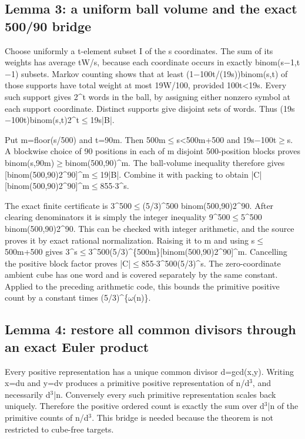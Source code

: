 \documentclass[11pt,a4paper]{article}
\begin{document}
\subsection{Lemma 3: a uniform ball volume and the exact 500/90 bridge}
Choose uniformly a t-element subset I of the s coordinates. The sum of its weights has average tW/s, because each coordinate occurs in exactly binom(s\ensuremath{-}1,t\ensuremath{-}1) subsets. Markov counting shows that at least (1\ensuremath{-}100t/(19s))binom(s,t) of those supports have total weight at most 19W/100, provided 100t<19s. Every such support gives 2\textasciicircum{}t words in the ball, by assigning either nonzero symbol at each support coordinate. Distinct supports give disjoint sets of words. Thus (19s\ensuremath{-}100t)binom(s,t)2\textasciicircum{}t\ensuremath{\leq}19s|B|.

Put m=floor(s/500) and t=90m. Then 500m\ensuremath{\leq}s<500m+500 and 19s\ensuremath{-}100t\ensuremath{\geq}s. A blockwise choice of 90 positions in each of m disjoint 500-position blocks proves binom(s,90m)\ensuremath{\geq}binom(500,90)\textasciicircum{}m. The ball-volume inequality therefore gives [binom(500,90)2\textasciicircum{}90]\textasciicircum{}m\ensuremath{\leq}19|B|. Combine it with packing to obtain |C|[binom(500,90)2\textasciicircum{}90]\textasciicircum{}m\ensuremath{\leq}855\ensuremath{\cdot}3\textasciicircum{}s.

The exact finite certificate is 3\textasciicircum{}500\ensuremath{\leq}(5/3)\textasciicircum{}500 binom(500,90)2\textasciicircum{}90. After clearing denominators it is simply the integer inequality 9\textasciicircum{}500\ensuremath{\leq}5\textasciicircum{}500 binom(500,90)2\textasciicircum{}90. This can be checked with integer arithmetic, and the source proves it by exact rational normalization. Raising it to m and using s\ensuremath{\leq}500m+500 gives 3\textasciicircum{}s\ensuremath{\leq}3\textasciicircum{}500(5/3)\textasciicircum{}\{500m\}[binom(500,90)2\textasciicircum{}90]\textasciicircum{}m. Cancelling the positive block factor proves |C|\ensuremath{\leq}855\ensuremath{\cdot}3\textasciicircum{}500(5/3)\textasciicircum{}s. The zero-coordinate ambient cube has one word and is covered separately by the same constant. Applied to the preceding arithmetic code, this bounds the primitive positive count by a constant times (5/3)\textasciicircum{}\{\ensuremath{\omega}(n)\}.

\subsection{Lemma 4: restore all common divisors through an exact Euler product}
Every positive representation has a unique common divisor d=gcd(x,y). Writing x=du and y=dv produces a primitive positive representation of n/d\ensuremath{^3}, and necessarily d\ensuremath{^3}|n. Conversely every such primitive representation scales back uniquely. Therefore the positive ordered count is exactly the sum over d\ensuremath{^3}|n of the primitive counts of n/d\ensuremath{^3}. This bridge is needed because the theorem is not restricted to cube-free targets.
\end{document}
